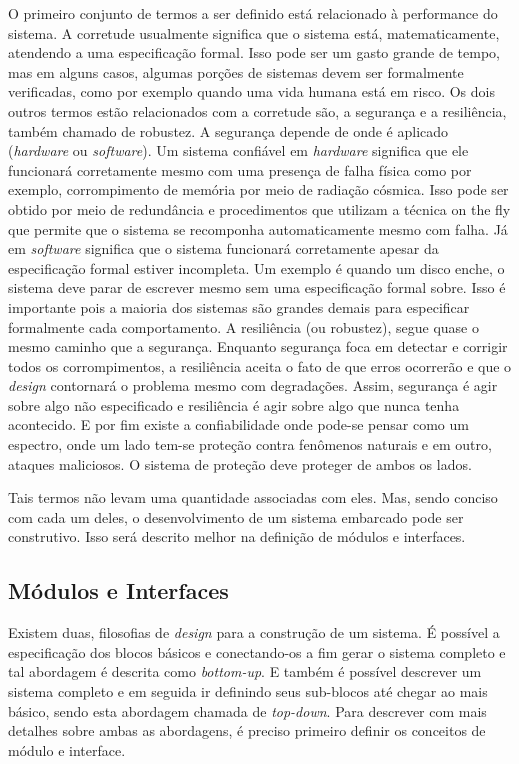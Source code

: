 O primeiro conjunto de termos a ser definido está relacionado à performance do sistema. A corretude usualmente significa que o sistema está, matematicamente, atendendo a uma especificação formal. Isso pode ser um gasto grande de tempo, mas em alguns casos, algumas porções de sistemas devem ser formalmente verificadas, como por exemplo quando uma vida humana está em risco. Os dois outros termos estão relacionados com a corretude são, a segurança e a resiliência, também chamado de robustez. A segurança depende de onde é aplicado (\textit{hardware} ou \textit{software}). Um sistema confiável em \textit{hardware} significa que ele funcionará corretamente mesmo com uma presença de falha física como por exemplo, corrompimento de memória por meio de radiação cósmica. Isso pode ser obtido por meio de redundância e procedimentos que utilizam a técnica on the fly que permite que o sistema se recomponha automaticamente mesmo com falha. Já em \textit{software} significa que o sistema funcionará corretamente apesar da especificação formal estiver incompleta. Um exemplo é quando um disco enche, o sistema deve parar de escrever mesmo sem uma especificação formal sobre. Isso é importante pois a maioria dos sistemas são grandes demais para especificar formalmente cada comportamento. A resiliência (ou robustez), segue quase o mesmo caminho que a segurança. Enquanto segurança foca em detectar e corrigir todos os corrompimentos, a resiliência aceita o fato de que erros ocorrerão e que o \textit{design} contornará o problema mesmo com degradações. Assim, segurança é agir sobre algo não especificado e resiliência é agir sobre algo que nunca tenha acontecido. E por fim existe a confiabilidade onde pode-se pensar como um espectro, onde um lado tem-se proteção contra fenômenos naturais e em outro, ataques maliciosos. O sistema de proteção deve proteger de ambos os lados.

Tais termos não levam uma quantidade associadas com eles. Mas, sendo conciso com cada um deles, o desenvolvimento de um sistema embarcado pode ser construtivo. Isso será descrito melhor na definição de módulos e interfaces.



\subsection{Módulos e Interfaces}

Existem duas, filosofias de \textit{design} para a construção de um sistema. É possível a especificação dos blocos básicos e conectando-os a fim gerar o sistema completo e tal abordagem é descrita como \textit{bottom-up}. E também é possível descrever um sistema completo e em seguida ir definindo seus sub-blocos até chegar ao mais básico, sendo esta abordagem chamada de \textit{top-down}. Para descrever com mais detalhes sobre ambas as abordagens, é preciso primeiro definir os conceitos de módulo e interface.

